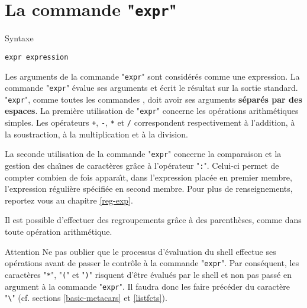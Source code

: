 \section{La commande "\texttt{expr}"}

\begin{definition}{Syntaxe}
\begin{verbatim}
expr expression
\end{verbatim}
\end{definition}

Les arguments de la commande "\texttt{expr}" sont consid{\'e}r{\'e}s comme une expression.
La commande "\texttt{expr}" {\'e}value ses arguments et {\'e}crit le r{\'e}sultat sur
la sortie standard. "\texttt{expr}", comme toutes les commandes {\Unix},
doit avoir ses arguments \textbf{s{\'e}par{\'e}s par des espaces}.
La premi{\`e}re utilisation de "\texttt{expr}" concerne les op{\'e}rations arithm{\'e}tiques
simples. Les op{\'e}rateurs \verb=+=, \verb=-=, \verb=*= et \verb=/= correspondent
respectivement {\`a} l'addition, {\`a} la soustraction, {\`a} la multiplication et
{\`a} la division.

La seconde utilisation de la commande "\texttt{expr}" concerne la comparaison et
la gestion des cha{\^\i}nes de caract{\`e}res gr{\^a}ce {\`a} l'op{\'e}rateur "\verb=:=".
Celui-ci permet de compter combien de fois appara{\^\i}t, dans l'expression plac{\'e}e
en premier membre, l'expression r{\'e}guli{\`e}re sp{\'e}cifi{\'e}e en second membre.
Pour plus de renseignements, reportez vous au chapitre \ref{reg-exp}.

Il est possible d'effectuer des regroupements gr{\^a}ce {\`a} des parenth{\`e}ses, comme
dans toute op{\'e}ration arithm{\'e}tique.

\begin{definition}{{\large Attention}}
Ne pas oublier que le processus d'{\'e}valuation du shell effectue ses op{\'e}rations
avant de passer le contr{\^o}le {\`a} la commande "\texttt{expr}".
Par cons{\'e}quent, les caract{\`e}res "\verb=*=", "\verb=(=" et
"\verb=)=" risquent d'{\^e}tre {\'e}valu{\'e}s par le shell et non
pas pass{\'e} en argument {\`a} la commande "\texttt{expr}". Il
faudra donc les faire pr{\'e}c{\'e}der du caract{\`e}re "\verb=\="
(cf. sections \ref{basic-metacars} et \ref{listfcts}).
\end{definition}


